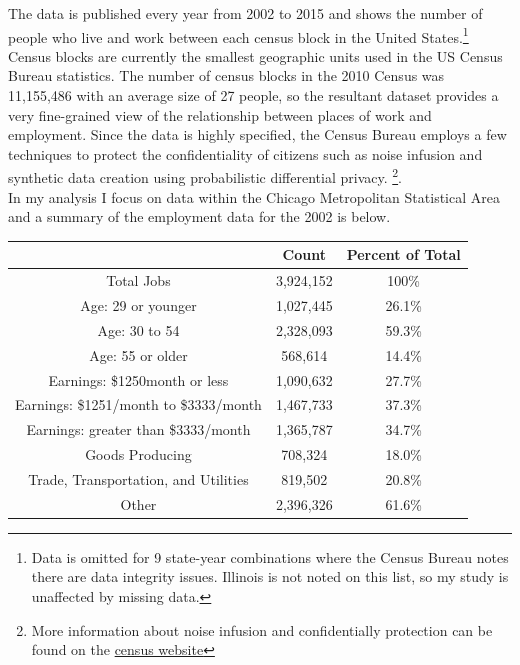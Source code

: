 \documentclass{article}
\theoremstyle{definition}
\theoremstyle{remark}
\newcommand\fnurl[2]{%
\href{#2}{#1}%
}
\begin{document}
The data is published every year from 2002 to 2015 and shows the number of people who live and work between each census block in the United States.\footnote{Data is omitted for 9 state-year combinations where the Census Bureau notes there are data integrity issues.  Illinois is not noted on this list, so my study is unaffected by missing data.}   Census blocks are currently the smallest geographic units used in the US Census Bureau statistics.  The number of census blocks in the 2010 Census was 11,155,486 with an average size of 27 people, so the resultant dataset provides a very fine-grained view of the relationship between places of work and employment.  Since the data is highly specified, the Census Bureau employs a few techniques to protect the confidentiality of citizens such as noise infusion and synthetic data creation using probabilistic differential privacy. \footnote{More information about noise infusion and confidentially protection can be found on the \fnurl{census website}{https://www2.census.gov/ces/wp/2014/CES-WP-14-30.pdf}}.\\

In my analysis I focus on data within the Chicago Metropolitan Statistical Area and a summary of the employment data for the 2002 is below. \\
\begin{center}
 \begin{tabular}{|| c | c | c||} 
 \hline
 & Count & Percent of Total \\[0.5ex] 
 \hline\hline
 Total Jobs & 3,924,152  & 100\% \\  \hline
 Age: 29 or younger & 1,027,445 & 26.1\% \\ 
 Age: 30 to 54 & 2,328,093 & 59.3\% \\
 Age: 55 or older & 568,614 & 14.4\% \\ \hline
 Earnings: \$1250month or less & 1,090,632 & 27.7\% \\ 
 Earnings: \$1251/month to \$3333/month  & 1,467,733 & 37.3\% \\ 
 Earnings: greater than \$3333/month & 1,365,787 & 34.7\% \\ \hline
 Goods Producing  & 708,324 & 18.0\% \\ 
 Trade, Transportation, and Utilities  & 819,502 & 20.8\% \\ 
 Other  & 2,396,326 & 61.6\% \\ \hline 
\end{tabular}
\end{center}
\end{document}
